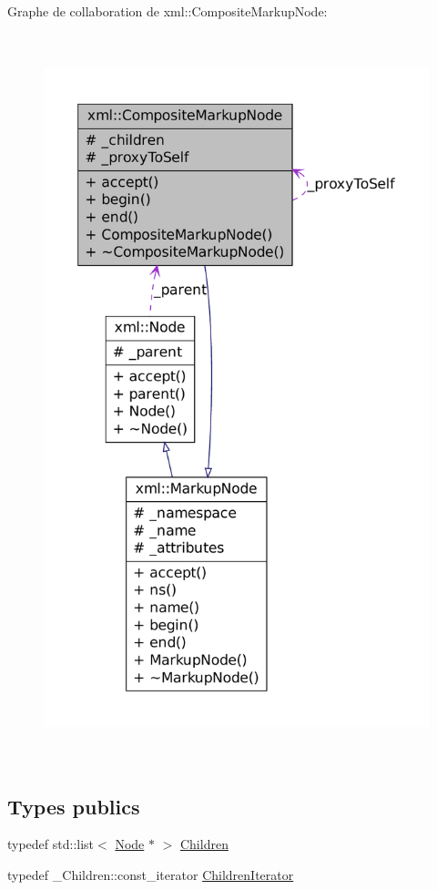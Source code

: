 Graphe de collaboration de xml::CompositeMarkupNode:\nopagebreak
\begin{figure}[H]
\begin{center}
\leavevmode
\includegraphics[height=600pt]{classxml_1_1_composite_markup_node__coll__graph}
\end{center}
\end{figure}
\subsection*{Types publics}
\begin{DoxyCompactItemize}
\item 
typedef std::list$<$ \hyperlink{classxml_1_1_node}{Node} $\ast$ $>$ \hyperlink{classxml_1_1_composite_markup_node_ac70e1fdb5fc2e0011378f7284c31fe5c}{Children}
\item 
typedef \_\-Children::const\_\-iterator \hyperlink{classxml_1_1_composite_markup_node_abdd7123eab75fb90a4a95b1976693ed7}{ChildrenIterator}
\end{DoxyCompactItemize}
